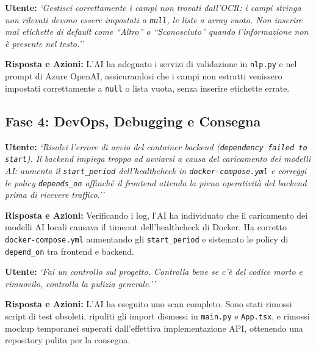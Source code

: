 \documentclass[12pt,a4paper,oneside]{report}
\begin{document}
\begin{promptbox}[title={Prompt 9 --- Gestione Campi Vuoti nell'Estrazione OCR}]
\textbf{Utente:} \textit{`Gestisci correttamente i campi non trovati dall'OCR: i campi stringa non rilevati devono essere impostati a \texttt{null}, le liste a array vuoto. Non inserire mai etichette di default come ``Altro'' o ``Sconosciuto'' quando l'informazione non è presente nel testo.''}

\textbf{Risposta e Azioni:} L'AI ha adeguato i servizi di validazione in \texttt{nlp.py} e nel prompt di Azure OpenAI, assicurandosi che i campi non estratti venissero impostati correttamente a \texttt{null} o lista vuota, senza inserire etichette errate.
\end{promptbox}

\subsection{Fase 4: DevOps, Debugging e Consegna}

\begin{promptbox}[title={Prompt 10 --- Correzione Healthcheck e Avvio Docker}]
\textbf{Utente:} \textit{`Risolvi l'errore di avvio del container backend (\texttt{dependency failed to start}). Il backend impiega troppo ad avviarsi a causa del caricamento dei modelli AI: aumenta il \texttt{start\_period} dell'healthcheck in \texttt{docker-compose.yml} e correggi le policy \texttt{depends\_on} affinché il frontend attenda la piena operatività del backend prima di ricevere traffico.''}

\textbf{Risposta e Azioni:} Verificando i log, l'AI ha individuato che il caricamento dei modelli AI locali causava il timeout dell'healthcheck di Docker. Ha corretto \texttt{docker-compose.yml} aumentando gli \texttt{start\_period} e sistemato le policy di \texttt{depend\_on} tra frontend e backend.
\end{promptbox}

\vspace{1em}

\begin{promptbox}[title={Prompt 11 --- Code Audit e Pulizia della Codebase}]
\textbf{Utente:} \textit{`Fai un controllo sul progetto. Controlla bene se c'è del codice morto e rimuovilo, controlla la pulizia generale.''}

\textbf{Risposta e Azioni:} L'AI ha eseguito uno scan completo. Sono stati rimossi script di test obsoleti, ripuliti gli import dismessi in \texttt{main.py} e \texttt{App.tsx}, e rimossi mockup temporanei superati dall'effettiva implementazione API, ottenendo una repository pulita per la consegna.
\end{promptbox}
\end{document}
